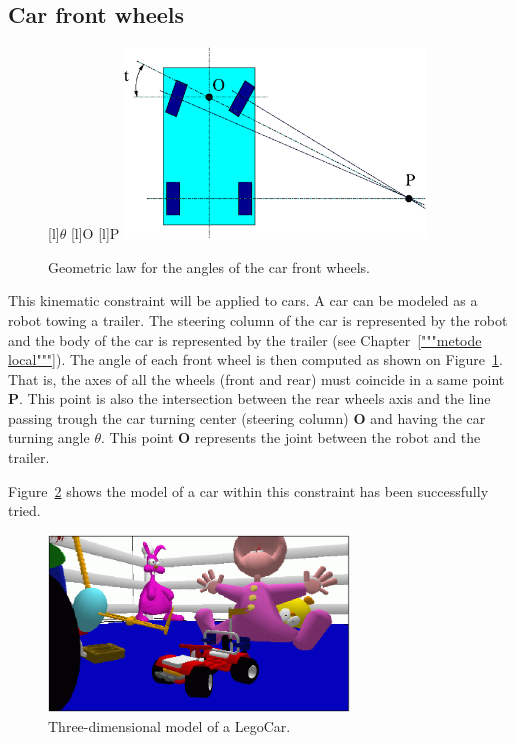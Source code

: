 \subsection*{Car front wheels}

\begin{figure}[ht!]
\begin{center}
[l]{$\theta$} 
[l]{O} 
[l]{P}    
  \includegraphics[width=8cm]{FIG/Constraint/carfw.eps}
\end{center}
\caption{\label{fig:carfw} Geometric law for the angles of the car 
  front wheels.}
\end{figure}

This kinematic constraint will be applied to cars. A car can be
modeled as a robot towing a trailer. The steering column of the car is
represented by the robot and the body of the car is represented by the
trailer (see Chapter~\ref{"""metode local"""}). The angle of each
front wheel is then computed as shown on Figure~\ref{fig:carfw}.
That is, the axes of all the wheels (front and rear) must coincide in
a same point {\bf P}.  This point is also the intersection between the
rear wheels axis and the line passing trough the car turning center
(steering column) {\bf O} and having the car turning angle $\theta$.
This point {\bf O} represents the joint between the robot and the
trailer.

Figure~\ref{fig:LegoCar} shows the model of a car
within this constraint has been successfully tried.



\begin{figure}[htb!]
\begin{center}
  \includegraphics[width=8cm]{FIG/Constraint/LegoCar.eps}
\end{center}
\caption{\label{fig:LegoCar} Three-dimensional model of a LegoCar.}
\end{figure}


